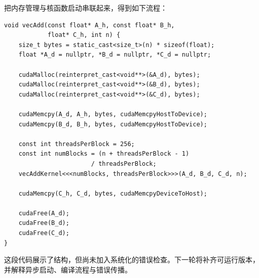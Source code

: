 \par\noindent\begin{minipage}{\linewidth}
把内存管理与核函数启动串联起来，得到如下流程：

\begin{lstlisting}[style=cuda]
void vecAdd(const float* A_h, const float* B_h,
            float* C_h, int n) {
    size_t bytes = static_cast<size_t>(n) * sizeof(float);
    float *A_d = nullptr, *B_d = nullptr, *C_d = nullptr;

    cudaMalloc(reinterpret_cast<void**>(&A_d), bytes);
    cudaMalloc(reinterpret_cast<void**>(&B_d), bytes);
    cudaMalloc(reinterpret_cast<void**>(&C_d), bytes);

    cudaMemcpy(A_d, A_h, bytes, cudaMemcpyHostToDevice);
    cudaMemcpy(B_d, B_h, bytes, cudaMemcpyHostToDevice);

    const int threadsPerBlock = 256;
    const int numBlocks = (n + threadsPerBlock - 1)
                        / threadsPerBlock;
    vecAddKernel<<<numBlocks, threadsPerBlock>>>(A_d, B_d, C_d, n);

    cudaMemcpy(C_h, C_d, bytes, cudaMemcpyDeviceToHost);

    cudaFree(A_d);
    cudaFree(B_d);
    cudaFree(C_d);
}
\end{lstlisting}
\end{minipage}\par

这段代码展示了结构，但尚未加入系统化的错误检查。下一轮将补齐可运行版本，并解释异步启动、编译流程与错误传播。
